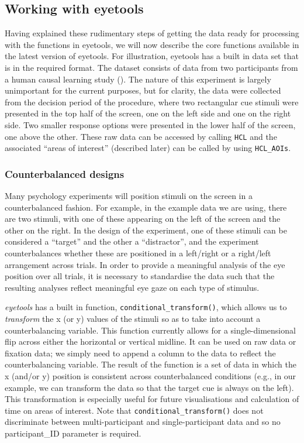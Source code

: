 \documentclass[
  man,
  floatsintext,
  longtable,
  nolmodern,
  notxfonts,
  notimes,
  colorlinks=true,linkcolor=blue,citecolor=blue,urlcolor=blue]{apa7}
\begin{document}
\subsection{Working with eyetools}\label{working-with-eyetools}

Having explained these rudimentary steps of getting the data ready for
processing with the functions in eyetools, we will now describe the core
functions available in the latest version of eyetools. For illustration,
eyetools has a built in data set that is in the required format. The
dataset consists of data from two participants from a human causal
learning study (). The
nature of this experiment is largely unimportant for the current
purposes, but for clarity, the data were collected from the decision
period of the procedure, where two rectangular cue stimuli were
presented in the top half of the screen, one on the left side and one on
the right side. Two smaller response options were presented in the lower
half of the screen, one above the other. These raw data can be accessed
by calling \texttt{HCL} and the associated ``areas of interest''
(described later) can be called by using \texttt{HCL\_AOIs}.

\subsubsection{Counterbalanced designs}\label{counterbalanced-designs}

Many psychology experiments will position stimuli on the screen in a
counterbalanced fashion. For example, in the example data we are using,
there are two stimuli, with one of these appearing on the left of the
screen and the other on the right. In the design of the experiment, one
of these stimuli can be considered a ``target'' and the other a
``distractor'', and the experiment counterbalances whether these are
positioned in a left/right or a right/left arrangement across trials. In
order to provide a meaningful analysis of the eye position over all
trials, it is necessary to standardise the data such that the resulting
analyses reflect meaningful eye gaze on each type of stimulus.

\emph{eyetools} has a built in function,
\texttt{conditional\_transform()}, which allows us to \emph{transform}
the x (or y) values of the stimuli so as to take into account a
counterbalancing variable. This function currently allows for a
single-dimensional flip across either the horizontal or vertical
midline. It can be used on raw data or fixation data; we simply need to
append a column to the data to reflect the counterbalancing variable.
The result of the function is a set of data in which the x (and/or y)
position is consistent across counterbalanced conditions (e.g., in our
example, we can transform the data so that the target cue is always on
the left). This transformation is especially useful for future
visualisations and calculation of time on areas of interest. Note that
\texttt{conditional\_transform()} does not discriminate between
multi-participant and single-participant data and so no participant\_ID
parameter is required.
\end{document}
